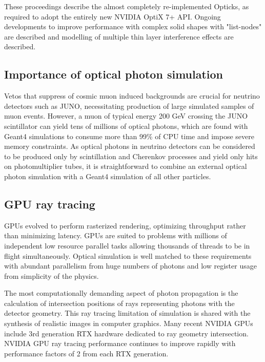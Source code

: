 \documentclass{webofc}
\begin{document}
These proceedings describe the almost completely re-implemented Opticks,
as required to adopt the entirely new NVIDIA OptiX 7+ API. 
Ongoing developments to improve performance with complex solid shapes with "list-nodes" are described
and modelling of multiple thin layer interference effects are described. 
%
%
\subsection{Importance of optical photon simulation}%
%
%
Vetos that suppress of cosmic muon induced backgrounds are crucial for neutrino
detectors such as JUNO\cite{juno}, necessitating production of large simulated samples of muon events. 
However, a muon of typical energy 200 GeV crossing the JUNO scintillator can yield tens of millions of 
optical photons, which are found with Geant4 simulations to consume more than 99\% of CPU time
and impose severe memory constraints.
%
As optical photons in neutrino detectors can be considered to be produced
only by scintillation and Cherenkov processes and yield only hits
on photomultiplier tubes, it is straightforward to combine an external optical photon simulation 
with a Geant4 simulation of all other particles.
%
\subsection{GPU ray tracing}%
%
GPUs evolved to perform rasterized rendering, optimizing throughput\cite{throughput} rather than minimizing latency.
GPUs are suited to problems with millions of independent low resource parallel tasks allowing thousands of threads 
to be in flight simultaneously.
Optical simulation is well matched to these requirements with abundant parallelism 
from huge numbers of photons and low register usage from simplicity of the physics.

The most computationally demanding aspect of photon propagation
is the calculation of intersection positions of rays representing photons with the detector geometry.
This ray tracing limitation of simulation is shared with the synthesis of realistic images in computer graphics. 
Many recent NVIDIA GPUs include 3rd generation RTX\cite{rtx} hardware dedicated to ray geometry intersection. 
NVIDIA GPU ray tracing performance continues to improve rapidly with performance factors of 2 
from each RTX generation. 
%
%
\end{document}

